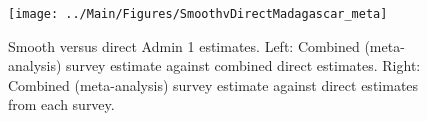 \documentclass[12pt]{article}\usepackage[]{graphicx}\usepackage[]{color}
\newenvironment{knitrout}{}{} %
\begin{document}



\begin{knitrout}
\color{fgcolor}\begin{figure}[bht]

{\centering \texttt{[image: ../Main/Figures/SmoothvDirectMadagascar\_meta]} 

}

\caption[Smooth versus direct Admin 1 estimates]{Smooth versus direct Admin 1 estimates. Left: Combined (meta-analysis) survey estimate against combined direct estimates. Right: Combined (meta-analysis) survey estimate against direct estimates from each survey.}\label{fig:unnamed-chunk-193}
\end{figure}


\end{knitrout}
\end{document}
